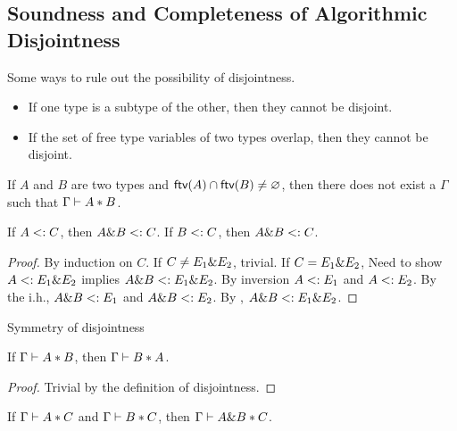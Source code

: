 \subsection{Soundness and Completeness of Algorithmic Disjointness}

Some ways to rule out the possibility of disjointness.

\begin{itemize}
  \item If one type is a subtype of the other, then they cannot be disjoint.
  \item If the set of free type variables of two types overlap, then they cannot
  be disjoint.
\end{itemize}

\begin{lemma}
  If $A$ and $B$ are two types and $\textsf{ftv}(A) \cap \textsf{ftv}(B) \neq \varnothing$, then
  there does not exist a $\Gamma$ such that $\Gamma \vdash A * B$.
\end{lemma}

\begin{theorem}
  If $A <: C$, then $A \& B <: C$.
  If $B <: C$, then $A \& B <: C$.
\end{theorem}


\begin{proof}
  By induction on $C$.
  If $C \neq E_1 \& E_2$, trivial.
  If $C = E_1 \& E_2$,
  Need to show $A <: E_1 \& E_2$ implies $A \& B <: E_1 \& E_2$.
  By inversion $A <: E_1$ and $A <: E_2$.
  By the i.h., $A \& B <: E_1$ and $A \& B <: E_2$.
  By , $A \& B <: E_1 \& E_2$.
\end{proof}

\begin{lemma}{Symmetry of disjointness}
  \label{lemma:symmetry-of-disjointness}

  If $\Gamma \vdash A * B$, then $\Gamma \vdash B * A$.
\end{lemma}

\begin{proof}
  Trivial by the definition of disjointness.
\end{proof}

\begin{theorem}
  \label{theorem:disjoint-intersect}

  If $\Gamma \vdash A * C$ and $\Gamma \vdash B * C$,
  then $\Gamma \vdash A \& B * C$.
\end{theorem}

